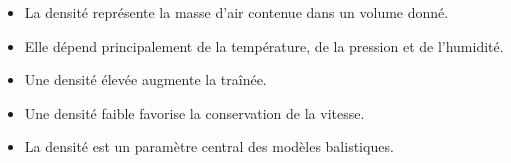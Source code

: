 \begin{aretenir}

\begin{itemize}
\item La densité représente la masse d'air contenue dans un volume
donné.
\item Elle dépend principalement de la température, de la pression et
de l'humidité.
\item Une densité élevée augmente la traînée.
\item Une densité faible favorise la conservation de la vitesse.
\item La densité est un paramètre central des modèles balistiques.
\end{itemize}

\end{aretenir}

